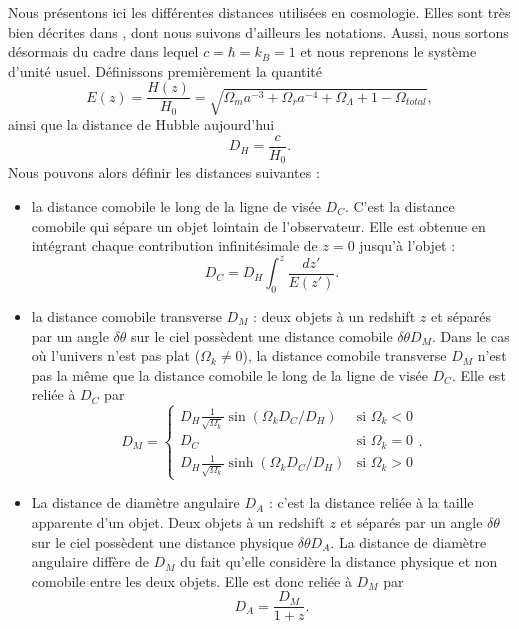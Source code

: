 \documentclass[11pt, twoside, a4paper, openright]{report}
\begin{document}
Nous présentons ici les différentes distances utilisées en cosmologie. Elles sont très bien décrites dans \cite{hogg_distance_1999}, dont nous suivons d'ailleurs les notations. Aussi, nous sortons désormais du cadre dans lequel $c = \hbar = k_{B} = 1$ et nous reprenons le système d'unité usuel. Définissons premièrement la quantité
\begin{equation}
  \label{eq:dist_ez}
  E(z) = \frac{H(z)}{H_0} 
  = \sqrt{\Omega_m a^{-3} + \Omega_r a^{-4} + \Omega_{\Lambda} + 1 - \Omega_{total}} ,
\end{equation}
ainsi que la distance de Hubble aujourd'hui
\begin{equation}
  \label{eq:dist_hubble}
  D_H = \frac{c}{H_0} .
\end{equation}
Nous pouvons alors définir les distances suivantes :
\begin{itemize}[label=$\bullet$]
\item la distance comobile le long de la ligne de visée $D_{C}$. C'est la distance comobile qui sépare un objet lointain de l'observateur. Elle est obtenue en intégrant chaque contribution infinitésimale de $z=0$ jusqu'à l'objet :
  \begin{equation}
    \label{eq:dist_como}
    D_{C} = D_H \int_0^z \frac{dz'}{E(z')} .
  \end{equation}
\item la distance comobile transverse $D_M$ : deux objets à un redshift $z$ et séparés par un angle $\delta \theta$ sur le ciel possèdent une distance comobile $\delta \theta D_M$.
  Dans le cas où l'univers n'est pas plat ($\Omega_k \neq 0$), la distance comobile transverse $D_M$  n'est pas la même que la distance comobile le long de la ligne de visée $D_{C}$. Elle est reliée à $D_{C}$ par
  \begin{equation}
    \label{eq:dist_como_trans}
    D_M = \left\{
      \begin{array}{ll}
        D_H \frac{1}{\sqrt{\Omega_k}} \sin(\Omega_k D_C / D_H) & \mbox{si } \Omega_k < 0 \\
        D_C & \textrm{si } \Omega_k = 0 \\
        D_H \frac{1}{\sqrt{\Omega_k}} \sinh(\Omega_k D_C / D_H) & \mbox{si } \Omega_k > 0
      \end{array}
    \right..
  \end{equation}
 
\item La distance de diamètre angulaire $D_A$ : c'est la distance reliée à la taille apparente d'un objet. Deux objets à un redshift $z$ et séparés par un angle $\delta \theta$ sur le ciel possèdent une distance physique $\delta \theta D_A$. La distance de diamètre angulaire diffère de $D_M$ du fait qu'elle considère la distance physique et non comobile entre les deux objets. Elle est donc reliée à $D_M$ par
  \begin{equation}
    \label{eq:dist_ang}
    D_A = \frac{D_M}{1+z}.
  \end{equation}


\end{itemize}
\end{document}
